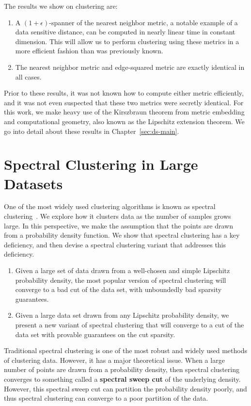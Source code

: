   The results we show on clustering are:
  \begin{enumerate}
  \item A $(1+\epsilon)$-spanner of the nearest neighbor metric, a notable example of a data sensitive
  distance, can be computed in nearly linear time in constant dimension.
  This will allow us to perform clustering using these metrics in a more
  efficient fashion than was previously known.
  \item The nearest neighbor metric and edge-squared metric are exactly
  identical in all cases.
  \end{enumerate}
  Prior to these results, it was not known how to compute either metric
  efficiently, and it was not even suspected that these two metrics were
  secretly identical. For this work, we make heavy use of the Kirszbraun theorem from
  metric embedding and computational geometry, also known as the Lipschitz extension theorem. We go into detail about these results in
  Chapter~\ref{sec:ds-main}.

  \section{Spectral Clustering in Large
    Datasets}\label{sec:spectral-limit}

  One of the most widely used clustering algorithms is known as
  spectral clustering~\cite{NgSpectral01}. We explore how it clusters data as the number of
  samples grows large. In this perspective, we make the assumption that
  the points are drawn from a probability density function. We show that
  spectral clustering has a key deficiency, and then devise a spectral
  clustering variant that addresses this deficiency. 

  \begin{enumerate}
  \item Given a large set of data drawn from a well-chosen and simple Lipschitz probability
  density, the most popular version of spectral clustering will converge
  to a bad cut of the data set, with unboundedly bad sparsity
  guarantees.
  \item Given a large data set drawn from any Lipschitz probability
  density, we present a new variant of spectral clustering that will
  converge to a cut of the data set with provable guarantees on
  the cut sparsity.
  \end{enumerate}
  
Traditional spectral clustering is one of the most robust and widely
used methods of clustering data. However, it has a major theoretical
issue. When a large number of points are drawn from a probability
density, then spectral clustering converges to something called a
\textbf{spectral sweep cut} of the underlying density.  However, this
spectral sweep cut can partition the probability density poorly, and
thus spectral clustering can converge to a poor partition of the data.

